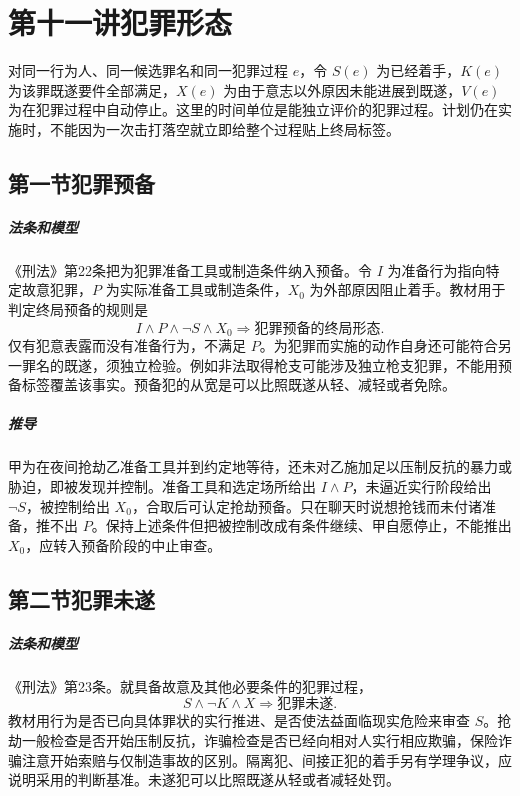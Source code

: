 \chapter{第十一讲\quad 犯罪形态}
\label{lecture:11}
\par

对同一行为人、同一候选罪名和同一犯罪过程 \(e\)，令 \(S(e)\) 为已经着手，\(K(e)\) 为该罪既遂要件全部满足，\(X(e)\) 为由于意志以外原因未能进展到既遂，\(V(e)\) 为在犯罪过程中自动停止。这里的时间单位是能独立评价的犯罪过程。计划仍在实施时，不能因为一次击打落空就立即给整个过程贴上终局标签。

\section{第一节\quad 犯罪预备}

\paragraph{法条和模型}
《刑法》第22条把为犯罪准备工具或制造条件纳入预备。令 \(I\) 为准备行为指向特定故意犯罪，\(P\) 为实际准备工具或制造条件，\(X_0\) 为外部原因阻止着手。教材用于判定终局预备的规则是
\[
I\land P\land\neg S\land X_0
\Longrightarrow \text{犯罪预备的终局形态}.
\]
仅有犯意表露而没有准备行为，不满足 \(P\)。为犯罪而实施的动作自身还可能符合另一罪名的既遂，须独立检验。例如非法取得枪支可能涉及独立枪支犯罪，不能用预备标签覆盖该事实。预备犯的从宽是可以比照既遂从轻、减轻或者免除。

\paragraph{推导}
甲为在夜间抢劫乙准备工具并到约定地等待，还未对乙施加足以压制反抗的暴力或胁迫，即被发现并控制。准备工具和选定场所给出 \(I\land P\)，未逼近实行阶段给出 \(\neg S\)，被控制给出 \(X_0\)，合取后可认定抢劫预备。只在聊天时说想抢钱而未付诸准备，推不出 \(P\)。保持上述条件但把被控制改成有条件继续、甲自愿停止，不能推出 \(X_0\)，应转入预备阶段的中止审查。

\section{第二节\quad 犯罪未遂}

\paragraph{法条和模型}
《刑法》第23条。就具备故意及其他必要条件的犯罪过程，
\[
S\land\neg K\land X\Longrightarrow \text{犯罪未遂}.
\]
教材用行为是否已向具体罪状的实行推进、是否使法益面临现实危险来审查 \(S\)。抢劫一般检查是否开始压制反抗，诈骗检查是否已经向相对人实行相应欺骗，保险诈骗注意开始索赔与仅制造事故的区别。隔离犯、间接正犯的着手另有学理争议，应说明采用的判断基准。未遂犯可以比照既遂从轻或者减轻处罚。

